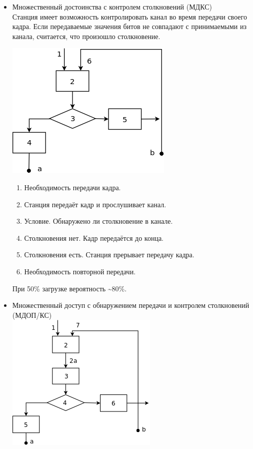 \documentclass[12pt, russian, oneside, article]{ncc}
\begin{document}
\begin{itemize}
\item Множественный достоинства с контролем столкновений (МДКС)\\
\label{sec-5_1_1_4}%
Станция имеет возможность контролировать канал во время передачи своего кадра. Если передаваемые значения битов не совпадают с принимаемыми из канала, считается, что произошло столкновение.

\includegraphics[]{images/SiSPI/mdks.png}

\begin{enumerate}
\item Необходимость передачи кадра.
\item Станция передаёт кадр и прослушивает канал.
\item Условие. Обнаружено ли столкновение в канале.
\item Столкновения нет. Кадр передаётся до конца.
\item Столкновения есть. Станция прерывает передачу кадра.
\item Необходимость повторной передачи.
\end{enumerate}

При 50\% загрузке вероятность \~{}80\%.


\item Множественный доступ с обнаружением передачи и контролем столкновений (МДОП/КС)\\
\label{sec-5_1_1_5}%
\includegraphics[]{images/SiSPI/mdopks.png}


\end{itemize}
\end{document}
